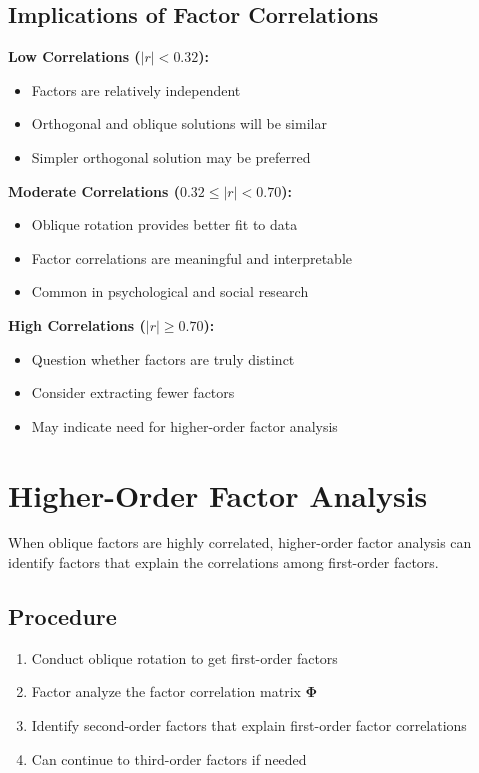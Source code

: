 \documentclass[a4paper]{tufte-book}
\begin{document}
\subsection{Implications of Factor Correlations}

\textbf{Low Correlations ($|r| < 0.32$):}
\begin{itemize}
\item Factors are relatively independent
\item Orthogonal and oblique solutions will be similar
\item Simpler orthogonal solution may be preferred
\end{itemize}

\textbf{Moderate Correlations ($0.32 \leq |r| < 0.70$):}
\begin{itemize}
\item Oblique rotation provides better fit to data
\item Factor correlations are meaningful and interpretable
\item Common in psychological and social research
\end{itemize}

\textbf{High Correlations ($|r| \geq 0.70$):}
\begin{itemize}
\item Question whether factors are truly distinct
\item Consider extracting fewer factors
\item May indicate need for higher-order factor analysis
\end{itemize}

\section{Higher-Order Factor Analysis}

When oblique factors are highly correlated, higher-order factor analysis can identify factors that explain the correlations among first-order factors.

\subsection{Procedure}

\begin{enumerate}
\item Conduct oblique rotation to get first-order factors
\item Factor analyze the factor correlation matrix $\boldsymbol{\Phi}$
\item Identify second-order factors that explain first-order factor correlations
\item Can continue to third-order factors if needed
\end{enumerate}
\end{document}
